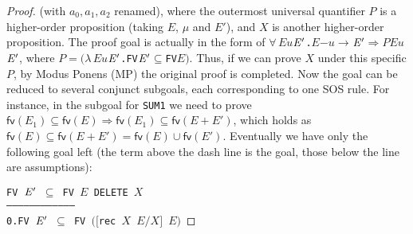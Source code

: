 \documentclass[GCNS]{yincog}
\renewcommand{\HOLinline}[1]{\mbox{\textup{\texttt{#1}}}}
\renewcommand{\HOLConst}[1]{\texttt{#1}}
\renewcommand{\HOLBoundVar}[1]{\ensuremath{\mathit{#1}}}
\renewcommand{\HOLFreeVar}[1]{\ensuremath{\mathit{#1}}}
\renewcommand{\HOLSymConst}[1]{#1}
\renewcommand{\HOLTokenSubset}{\ensuremath{\subseteq}}
\renewcommand{\HOLTokenForall}{\ensuremath{\forall \,}}
\renewcommand{\HOLTokenLambda}{\ensuremath{\lambda \,}}
\theoremstyle{remark}
\theoremstyle{theorem}
\theoremstyle{remark}
\newcommand{\HOLTokenTransBegin}{$-$}
\newcommand{\HOLTokenTransEnd}{$\rightarrow$\xspace}
\renewcommand{\HOLTokenImp}{\ensuremath{\Longrightarrow}}
\def\fvvtex#1{\rmsf{fv}(#1)}
\newcommand{\rmsf}[1]{{\mathsf{{#1}}}}
\begin{document}
\begin{proof}
(with $a_0, a_1, a_2$ renamed), where the outermost universal quantifier
$P$ is a higher-order proposition (taking $E$, $\mu $ and $E'$), and
$X$ is another higher-order proposition. The proof goal is actually in
the form of
\HOLinline{\HOLSymConst{\HOLTokenForall{}}\HOLBoundVar{E}\\\;\HOLBoundVar{u}\\\;\ensuremath{\HOLBoundVar{E}\sp{\prime}}.\\\;\HOLBoundVar{E}\\\;\HOLTokenTransBegin \HOLBoundVar{u}\HOLTokenTransEnd \\\;\ensuremath{\HOLBoundVar{E}\sp{\prime}}\\\;\HOLSymConst{\HOLTokenImp{}}\\\;\HOLFreeVar{P}\\\;\HOLBoundVar{E}\\\;\HOLBoundVar{u}\\\;\ensuremath{\HOLBoundVar{E}\sp{\prime}}},
where
\HOLinline{\HOLFreeVar{P}\\\;\HOLSymConst{\ensuremath{=}}\\\;\ensuremath{(}\HOLTokenLambda{}\HOLBoundVar{E}\\\;\HOLBoundVar{u}\\\;\ensuremath{\HOLBoundVar{E}\sp{\prime}}.\\\;\HOLConst{FV}\\\;\ensuremath{\HOLBoundVar{E}\sp{\prime}}\\\;\HOLSymConst{\HOLTokenSubset{}}\\\;\HOLConst{FV}\\\;\HOLBoundVar{E}\ensuremath{)}}.
Thus, if we can prove $X$ under this specific $P$, by Modus Ponens (MP)
the original proof is completed. Now the goal can be reduced to several
conjunct subgoals, each corresponding to one SOS rule. For instance, in
the subgoal for \texttt{SUM1} we need to prove
$\fvvtex{E_1} \subseteq \fvvtex{E} \Longrightarrow \fvvtex{E_1}
\subseteq \fvvtex{E + E'}$, which holds as
$\fvvtex{E} \subseteq \fvvtex{E + E'} = \fvvtex{E} \cup \fvvtex{E'}$. Eventually
we have only the following goal left (the term above the dash line is the
goal, those below the line are assumptions):
%
\begin{alltt}
        \HOLinline{\HOLConst{FV} \ensuremath{\HOLFreeVar{E}\sp{\prime}} \HOLSymConst{\HOLTokenSubset{}} \HOLConst{FV} \HOLFreeVar{E} \HOLConst{DELETE} \HOLFreeVar{X}}
   ------------------------------------
    0.  \HOLinline{\HOLConst{FV} \ensuremath{\HOLFreeVar{E}\sp{\prime}} \HOLSymConst{\HOLTokenSubset{}} \HOLConst{FV} \ensuremath{(}\ensuremath{[}\HOLConst{rec} \HOLFreeVar{X} \HOLFreeVar{E}\ensuremath{/}\HOLFreeVar{X}\ensuremath{]} \HOLFreeVar{E}\ensuremath{)}}

\end{alltt}
\end{proof}
\end{document}
